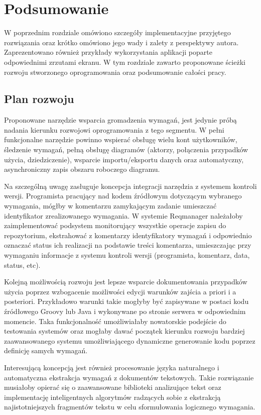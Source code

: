 \chapter{Podsumowanie}
  
  W poprzednim rozdziale omówiono szczegóły implementacyjne przyjętego rozwiązania oraz krótko omówiono jego wady i zalety z perspektywy autora. Zaprezentowano również przykłady wykorzystania aplikacji poparte odpowiednimi zrzutami ekranu. W tym rozdziale zawarto proponowane ścieżki rozwoju stworzonego oprogramowania oraz podsumowanie całości pracy.

  \section{Plan rozwoju}
  
    Proponowane narzędzie wsparcia gromadzenia wymagań, jest jedynie próbą nadania kierunku rozwojowi oprogramowania z tego segmentu. W pełni funkcjonalne narzędzie powinno wspierać obsługę wielu kont użytkowników, śledzenie wymagań, pełną obsługę diagramów (aktorzy, połączenia przypadków użycia, dziedziczenie), wsparcie importu/eksportu danych oraz automatyczny, asynchroniczny zapis obszaru roboczego diagramu. 
    
    Na szczególną uwagę zasługuje koncepcja integracji narzędzia z systemem kontroli wersji. Programista pracujący nad kodem źródłowym dotyczącym wybranego wymagania, mógłby w komentarzu zamykającym zadanie umieszczać identyfikator zrealizowanego wymagania. W systemie Reqmanager należałoby zaimplementować podsystem monitorujący wszystkie operacje zapisu do repozytorium, ekstrahować z komentarzy identyfikatory wymagań i odpowiednio oznaczać status ich realizacji na podstawie treści komentarza, umieszczając przy wymaganiu informacje z systemu kontroli wersji (programista, komentarz, data, status, etc).

    Kolejną możliwością rozwoju jest lepsze wsparcie dokumentowania przypadków użycia poprzez wzbogacenie możliwości edycji warunków zajścia a priori i a posteriori. Przykładowo warunki takie mogłyby być zapisywane w postaci kodu źródłowego Groovy lub Java i wykonywane po stronie serwera w odpowiednim momencie. Taka funkcjonalność umożliwiałaby nowatorskie podejście do testowania systemów oraz mogłaby dawać początek kierunku rozwoju bardziej zaawansowanego systemu umożliwiającego dynamiczne generowanie kodu poprzez definicję samych wymagań.

    Interesującą koncepcją jest również procesowanie języka naturalnego i automatyczna ekstrakcja wymagań z dokumentów tekstowych. Takie rozwiązanie musiałoby opierać się o zaawansowane biblioteki analizujące tekst oraz implementację inteligentnych algorytmów radzących sobie z ekstrakcją najistotniejszych fragmentów tekstu w celu sformułowania logicznego wymagania.

